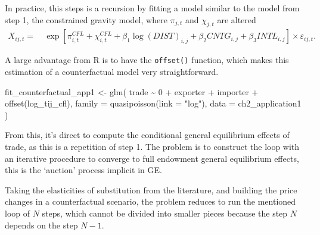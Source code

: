 \documentclass[12pt,reqno,oneside,pdftex]{formato-puc/puctesis} %
\newenvironment{Shaded}{\begin{snugshade}}{\end{snugshade}}
\newcommand{\AttributeTok}[1]{\textcolor[rgb]{0.77,0.63,0.00}{#1}}
\newcommand{\DecValTok}[1]{\textcolor[rgb]{0.00,0.00,0.81}{#1}}
\newcommand{\FunctionTok}[1]{\textcolor[rgb]{0.00,0.00,0.00}{#1}}
\newcommand{\NormalTok}[1]{#1}
\newcommand{\OtherTok}[1]{\textcolor[rgb]{0.56,0.35,0.01}{#1}}
\newcommand{\SpecialCharTok}[1]{\textcolor[rgb]{0.00,0.00,0.00}{#1}}
\newcommand{\StringTok}[1]{\textcolor[rgb]{0.31,0.60,0.02}{#1}}
\begin{document}
In practice, this steps is a recursion by fitting a model similar to the
model from step 1, the constrained gravity model, where \(\pi_{j,t}\)
and \(\chi_{j,t}\) are altered \begin{align*}
X_{ij,t} =& \:\exp\left[\pi_{i,t}^{CFL} + \chi_{i,t}^{CFL} + \beta_1 \log(DIST)_{i,j} + \beta_2 CNTG_{i,j} + \beta_3 INTL_{i,j}\right] \times \varepsilon_{ij,t}.
\end{align*}

A large advantage from R is to have the \texttt{offset()} function,
which makes this estimation of a counterfactual model very
straightforward.

\begin{Shaded}
\begin{Highlighting}[]
\NormalTok{fit\_counterfactual\_app1 }\OtherTok{\textless{}{-}} \FunctionTok{glm}\NormalTok{(}
\NormalTok{  trade }\SpecialCharTok{\textasciitilde{}} \DecValTok{0} \SpecialCharTok{+}\NormalTok{ exporter }\SpecialCharTok{+}\NormalTok{ importer }\SpecialCharTok{+} \FunctionTok{offset}\NormalTok{(log\_tij\_cfl),}
  \AttributeTok{family =} \FunctionTok{quasipoisson}\NormalTok{(}\AttributeTok{link =} \StringTok{"log"}\NormalTok{),}
  \AttributeTok{data =}\NormalTok{ ch2\_application1}
\NormalTok{)}
\end{Highlighting}
\end{Shaded}

From this, it's direct to compute the conditional general equilibrium
effects of trade, as this is a repetition of step 1. The problem is to
construct the loop with an iterative procedure to converge to full
endowment general equilibrium effects, this is the `auction' process
implicit in GE.

Taking the elasticities of substitution from the literature, and
building the price changes in a counterfactual scenario, the problem
reduces to run the mentioned loop of \(N\) steps, which cannot be
divided into smaller pieces because the step \(N\) depends on the step
\(N-1\).
\end{document}
